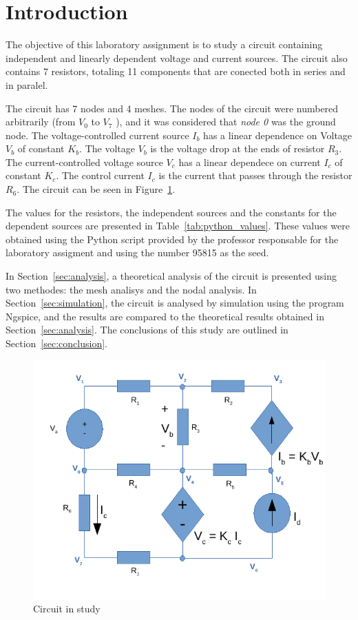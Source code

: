 \section{Introduction}
\label{sec:introduction}

\par The objective of this laboratory assignment is to study a circuit containing independent and 
linearly dependent voltage and current sources. The circuit also contains 7 resistors, totaling 11 components that are conected both in series and in paralel.\par
The circuit has 7 nodes and 4 meshes. The nodes of the circuit were numbered arbitrarily (from {\it$V_{0}$}  to {\it$V_{7}$} ), and it was considered that {\it node 0} was the ground node. The voltage-controlled current source {\it $I_b$} has a linear dependence on Voltage {\it $V_b$} of constant {\it $K_b$}. The voltage {\it $V_b$} is the voltage drop at the ends of resistor {\it $R_3$}. The current-controlled voltage source {\it $V_c$} has a linear dependece on current {\it $I_c$} of constant {\it $K_c$}. The control current {\it $I_c$} is the current that passes through the resistor {\it $R_6$}.
The circuit can be seen in Figure~\ref{fig:circuit_t1}.\par
The values for the resistors, the independent sources and the  constants for the dependent 
sources are presented in Table~\ref{tab:python_values}. These values were obtained using the
Python script provided by the professor responsable for the laboratory assigment
and using the number 95815 as the seed.\par

In Section~\ref{sec:analysis}, a theoretical analysis of the circuit is
presented using two methodes: the mesh analisys and the nodal analysis. In Section~\ref{sec:simulation}, the circuit is analysed by
simulation using the program Ngspice, and the results are compared to the theoretical results obtained in
Section~\ref{sec:analysis}. The conclusions of this study are outlined in
Section~\ref{sec:conclusion}.

\begin{figure}[h] \centering
\includegraphics[width=0.9\linewidth]{circuit_t1.pdf}
\caption{Circuit in study}
\label{fig:circuit_t1}
\end{figure}


